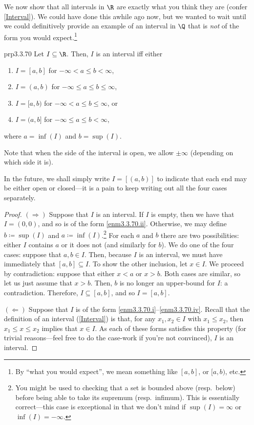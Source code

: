 We now show that all intervals in $\R$ are exactly what you think they are (confer \cref{Interval}).  We could have done this awhile ago now, but we wanted to wait until we could definitively provide an example of an interval in $\Q$ that is \emph{not} of the form you would expect.\footnote{By ``what you would expect'', we mean something like $[a,b]$, or $[a,b)$, etc.}
\begin{prp}{}{prp3.3.70}
Let $I\subseteq \R$.  Then, $I$ is an interval iff either
\begin{enumerate}
\item \label{enm3.3.70.i}$I=[a,b]$ for $-\infty <a\leq b<\infty $,
\item \label{enm3.3.70.ii}$I=(a,b)$ for $-\infty \leq a\leq b\leq \infty$,
\item \label{enm3.3.70.iii}$I=[a,b)$ for $-\infty <a\leq b\leq \infty$, or
\item \label{enm3.3.70.iv}$I=(a,b]$ for $-\infty \leq a\leq b<\infty$,
\end{enumerate}
where $a=\inf (I)$ and $b=\sup (I)$.
\begin{rmk}
Note that when the side of the interval is open, we allow $\pm \infty$ (depending on which side it is).
\end{rmk}
\begin{rmk}
In the future, we shall simply write $I=[(a,b)]$\index[notation]{$[(a,b)]$} to indicate that each end may be either open or closed---it is a pain to keep writing out all the four cases separately.
\end{rmk}
\begin{proof}
$(\Rightarrow )$ Suppose that $I$ is an interval.  If $I$ is empty, then we have that $I=(0,0)$, and so is of the form \cref{enm3.3.70.ii}.  Otherwise, we may define $b\coloneqq \sup (I)$ and $a\coloneqq \inf (I)$.\footnote{You might be used to checking that a set is bounded above (resp.~below) before being able to take its supremum (resp.~infimum).  This is essentially correct---this case is exceptional in that we don't mind if $\sup (I)=\infty$ or $\inf (I)=-\infty$.}  For each $a$ and $b$ there are two possibilities: either $I$ contains $a$ or it does not (and similarly for $b$).  We do one of the four cases:  suppose that $a,b\in I$.  Then, because $I$ is an interval, we must have immediately that $[a,b]\subseteq I$.  To show the other inclusion, let $x\in I$.  We proceed by contradiction:  suppose that either $x<a$ or $x>b$.  Both cases are similar, so let us just assume that $x>b$.  Then, $b$ is no longer an upper-bound for $I$:  a contradiction.  Therefore, $I\subseteq [a,b]$, and so $I=[a,b]$.

\blankline
\noindent
$(\Leftarrow )$ Suppose that $I$ is of the form \cref{enm3.3.70.i}--\cref{enm3.3.70.iv}.  Recall that the definition of an interval (\cref{Interval}) is that, for any $x_1,x_2\in I$ with $x_1\leq x_2$, then $x_1\leq x\leq x_2$ implies that $x\in I$.  As each of these forms satisfies this property (for trivial reasons---feel free to do the case-work if you're not convinced), $I$ is an interval.
\end{proof}
\end{prp}

